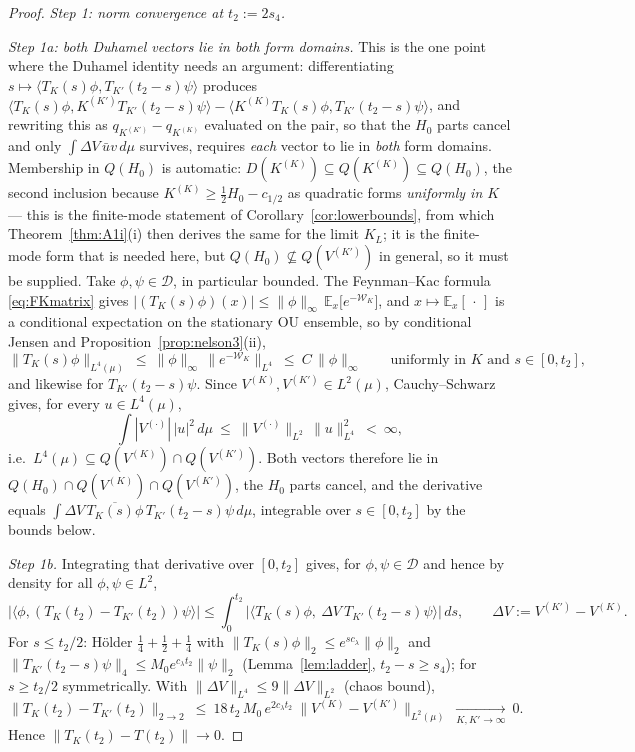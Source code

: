 \documentclass[11pt,a4paper]{article}
\theoremstyle{plain}
\theoremstyle{definition}
\newcommand{\E}{\mathbb{E}}
\newcommand{\D}{\mathcal D}
\newcommand{\ip}[2]{\langle #1,#2\rangle}
\newcommand{\muv}{\mu}
\begin{document}
\begin{proof}
\emph{Step 1: norm convergence at $t_2:=2s_4$.}

\emph{Step 1a: both Duhamel vectors lie in both form domains.} This is the
one point where the Duhamel identity needs an argument: differentiating
$s\mapsto\ip{T_K(s)\phi}{T_{K'}(t_2-s)\psi}$ produces
$\ip{T_K(s)\phi}{K^{(K')}T_{K'}(t_2-s)\psi}
-\ip{K^{(K)}T_K(s)\phi}{T_{K'}(t_2-s)\psi}$, and rewriting this as
$q_{K^{(K')}}-q_{K^{(K)}}$ evaluated on the pair, so that the $H_0$ parts
cancel and only $\int\Delta V\,\bar uv\,d\muv$ survives, requires
\emph{each} vector to lie in \emph{both} form domains. Membership in
$Q(H_0)$ is automatic: $D(K^{(K)})\subseteq Q(K^{(K)})\subseteq Q(H_0)$, the second
inclusion because $K^{(K)}\ge\tfrac12H_0-c_{1/2}$ as quadratic forms \emph{uniformly
in $K$} --- this is the finite-mode statement of Corollary~\ref{cor:lowerbounds}, from
which Theorem~\ref{thm:A1i}(i) then derives the same for the limit $K_L$; it is the
finite-mode form that is needed here, but $Q(H_0)\not\subseteq Q(V^{(K')})$ in general,
so it must be supplied. Take $\phi,\psi\in\D$, in particular bounded. The
Feynman--Kac formula \eqref{eq:FKmatrix} gives
$|(T_K(s)\phi)(x)|\le\|\phi\|_\infty\,\E_x\bigl[e^{-\mathcal W_K}\bigr]$, and
$x\mapsto\E_x[\,\cdot\,]$ is a conditional expectation on the stationary OU
ensemble, so by conditional Jensen and
Proposition~\ref{prop:nelson3}(ii),
\[
 \|T_K(s)\phi\|_{L^4(\muv)}\ \le\ \|\phi\|_\infty\,
 \bigl\|e^{-\mathcal W_K}\bigr\|_{L^4}\ \le\ C\,\|\phi\|_\infty
 \qquad\text{uniformly in }K\text{ and }s\in[0,t_2],
\]
and likewise for $T_{K'}(t_2-s)\psi$. Since $V^{(K)},V^{(K')}\in
L^2(\muv)$, Cauchy--Schwarz gives, for every $u\in L^4(\muv)$,
\[
 \int|V^{(\cdot)}|\,|u|^2\,d\muv
 \ \le\ \|V^{(\cdot)}\|_{L^2}\,\|u\|_{L^4}^2\ <\ \infty,
\]
i.e.\ $L^4(\muv)\subseteq Q(V^{(K)})\cap Q(V^{(K')})$. Both vectors
therefore lie in $Q(H_0)\cap Q(V^{(K)})\cap Q(V^{(K')})$, the $H_0$ parts
cancel, and the derivative equals
$\int\Delta V\,\overline{T_K(s)\phi}\,T_{K'}(t_2-s)\psi\,d\muv$,
integrable over $s\in[0,t_2]$ by the bounds below.

\emph{Step 1b.} Integrating that derivative over $[0,t_2]$ gives, for
$\phi,\psi\in\D$ and hence by density for all $\phi,\psi\in L^2$,
\[
 \bigl|\ip{\phi}{(T_K(t_2)-T_{K'}(t_2))\psi}\bigr|
 \le\int_0^{t_2}\bigl|\ip{T_K(s)\phi}{\ \Delta V\ T_{K'}(t_2-s)\psi}
 \bigr|\,ds,\qquad\Delta V:=V^{(K')}-V^{(K)} .
\]
For $s\le t_2/2$: H\"older $\tfrac14+\tfrac12+\tfrac14$ with
$\|T_K(s)\phi\|_2\le e^{sc_\lambda}\|\phi\|_2$ and
$\|T_{K'}(t_2-s)\psi\|_4\le M_0e^{c_\lambda t_2}\|\psi\|_2$
(Lemma~\ref{lem:ladder}, $t_2-s\ge s_4$); for $s\ge t_2/2$
symmetrically. With $\|\Delta V\|_{L^4}\le9\|\Delta V\|_{L^2}$ (chaos
bound),
\begin{equation}
 \|T_K(t_2)-T_{K'}(t_2)\|_{2\to2}
 \ \le\ 18\,t_2\,M_0\,e^{2c_\lambda t_2}\ \|V^{(K)}-V^{(K')}\|_{L^2(\muv)}
 \ \xrightarrow[K,K'\to\infty]{}\ 0 .
 \label{eq:normcauchy}
\end{equation}
Hence $\|T_K(t_2)-T(t_2)\|\to0$.


\end{proof}
\end{document}
